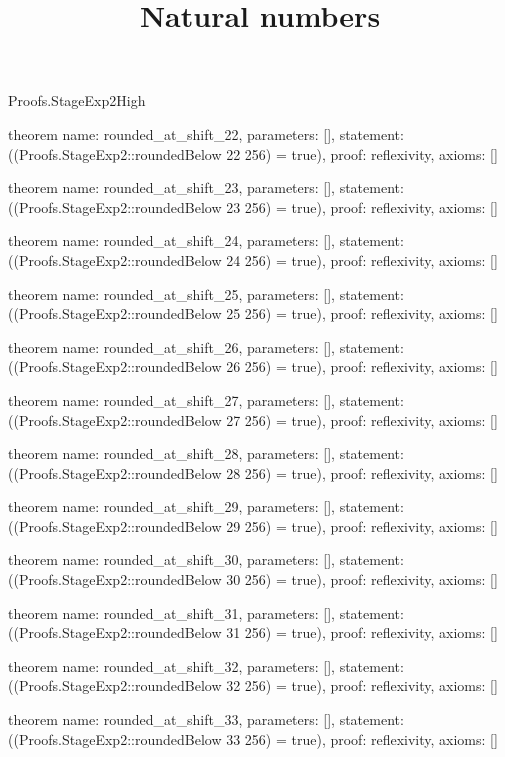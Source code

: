 \begin{lexlean}{Proofs.StageExp2High}
\title{Natural numbers}
\begin{semanticmodule}
theorem{
  name: rounded_at_shift_22,
  parameters: [],
  statement: ((Proofs.StageExp2::roundedBelow 22 256) = true),
  proof: reflexivity{},
  axioms: []
}

theorem{
  name: rounded_at_shift_23,
  parameters: [],
  statement: ((Proofs.StageExp2::roundedBelow 23 256) = true),
  proof: reflexivity{},
  axioms: []
}

theorem{
  name: rounded_at_shift_24,
  parameters: [],
  statement: ((Proofs.StageExp2::roundedBelow 24 256) = true),
  proof: reflexivity{},
  axioms: []
}

theorem{
  name: rounded_at_shift_25,
  parameters: [],
  statement: ((Proofs.StageExp2::roundedBelow 25 256) = true),
  proof: reflexivity{},
  axioms: []
}

theorem{
  name: rounded_at_shift_26,
  parameters: [],
  statement: ((Proofs.StageExp2::roundedBelow 26 256) = true),
  proof: reflexivity{},
  axioms: []
}

theorem{
  name: rounded_at_shift_27,
  parameters: [],
  statement: ((Proofs.StageExp2::roundedBelow 27 256) = true),
  proof: reflexivity{},
  axioms: []
}

theorem{
  name: rounded_at_shift_28,
  parameters: [],
  statement: ((Proofs.StageExp2::roundedBelow 28 256) = true),
  proof: reflexivity{},
  axioms: []
}

theorem{
  name: rounded_at_shift_29,
  parameters: [],
  statement: ((Proofs.StageExp2::roundedBelow 29 256) = true),
  proof: reflexivity{},
  axioms: []
}

theorem{
  name: rounded_at_shift_30,
  parameters: [],
  statement: ((Proofs.StageExp2::roundedBelow 30 256) = true),
  proof: reflexivity{},
  axioms: []
}

theorem{
  name: rounded_at_shift_31,
  parameters: [],
  statement: ((Proofs.StageExp2::roundedBelow 31 256) = true),
  proof: reflexivity{},
  axioms: []
}

theorem{
  name: rounded_at_shift_32,
  parameters: [],
  statement: ((Proofs.StageExp2::roundedBelow 32 256) = true),
  proof: reflexivity{},
  axioms: []
}

theorem{
  name: rounded_at_shift_33,
  parameters: [],
  statement: ((Proofs.StageExp2::roundedBelow 33 256) = true),
  proof: reflexivity{},
  axioms: []
}
\end{semanticmodule}
\end{lexlean}
